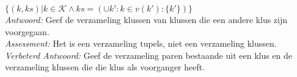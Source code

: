 
\item $\{ (k, ks) | k \in \mathcal{K} \wedge ks = (\cup k' : k \in v(k') : \{k'\}) \}$ \\


\emph{Antwoord:} Geef de verzameling klussen van klussen die een andere klus zijn voorgegaan.  \\
\emph{Assessment:} Het is een verzameling tupels, niet een verzameling klussen. \\

\emph{Verbeterd Antwoord:} Geef de verzameling paren bestaande uit een klus en de verzameling klussen die die klus als voorganger heeft. \\
